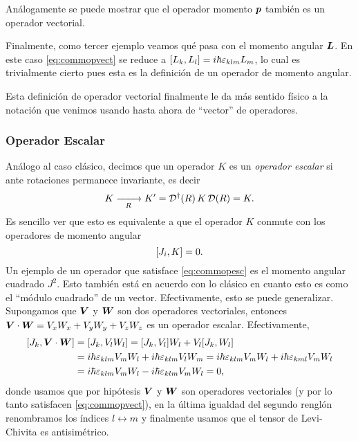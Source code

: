 \documentclass[10pt, a4paper]{article}
\numberwithin{equation}{subsection}
\begin{document}
Análogamente se puede mostrar que el operador momento $\vb*{p}$ también es un
operador vectorial.

Finalmente, como tercer ejemplo veamos qué pasa con el momento angular
$\vb*{L}$. En este caso \eqref{eq:commopvect} se reduce a $\comm{L_k}{L_l} =
i\hbar\lchivita_{klm}L_m$, lo cual es trivialmente cierto pues esta es la
definición de un operador de momento angular.

\bigbreak
Esta definición de operador vectorial finalmente le da más sentido físico a la
notación que venimos usando hasta ahora de ``vector'' de operadores.

\subsubsection{Operador Escalar}
Análogo al caso clásico, decimos que un operador $K$ es un \emph{operador
escalar} si ante rotaciones permanece invariante, es decir
\begin{equation} \label{eq:defopesc}
  K \xrightarrow[R]{\qquad} K' =
  \RotationOp^\dagger(R)\,K\,\RotationOp(R) = K.
\end{equation}
Es sencillo ver que esto es equivalente a que el operador $K$ conmute con los
operadores de momento angular
\begin{equation} \label{eq:commopesc}
  \comm{J_i}{K} = 0.
\end{equation}
Un ejemplo de un operador que satisface \eqref{eq:commopesc} es el momento
angular cuadrado $J^2$. Esto también está en acuerdo con lo clásico en cuanto
esto es como el ``módulo cuadrado'' de un vector. Efectivamente, esto se puede
generalizar. Supongamos que $\vb*{V}$ y $\vb*{W}$ son dos operadores
vectoriales, entonces $\vb*{V}\cdot\vb*{W} = V_xW_x + V_yW_y + V_zW_z$ es un
operador escalar. Efectivamente,
\begin{align}
  \comm{J_k}{\vect{V}\cdot\vect{W}} &= \comm{J_k}{V_lW_l} =
  \comm{J_k}{V_l}W_l + V_l\comm{J_k}{W_l} \\
  &= i\hbar\lchivita_{klm}V_mW_l + i\hbar\lchivita_{klm}V_lW_m
   = i\hbar\lchivita_{klm}V_mW_l + i\hbar\lchivita_{kml}V_mW_l \\
  &= i\hbar\lchivita_{klm}V_mW_l - i\hbar\lchivita_{klm}V_mW_l = 0,
\end{align}
donde usamos que por hipótesis $\vb*{V}$ y $\vb*{W}$ son operadores
vectoriales (y por lo tanto satisfacen \eqref{eq:commopvect}), en la última
igualdad del segundo renglón renombramos los índices $l\leftrightarrow m$ y
finalmente usamos que el tensor de Levi-Chivita es antisimétrico.
\end{document}
